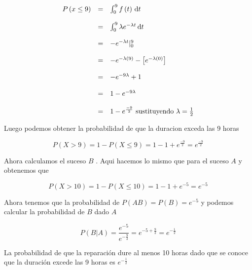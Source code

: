 \documentclass{article}
\begin{document}
\begin{flushleft}
        \begin{equation*}
            \begin{array}{rcl}
                P \left(x \le 9 \right) &  =  & \int_{0}^{9} f\left(t\right) \,\mathrm{d}t 
                \\
                \\
                                        &  =  & \int_{0}^{9} \lambda e^{- \lambda t}  \,\mathrm{d}t 
                \\
                \\
                                        &  =  & - e ^{-\lambda t } |_{0}^{9} 
                \\
                \\
                                        & = & -e^{- \lambda \left(9\right)} - \left[e^{-  \lambda \left(0\right) }\right]
                \\
                \\
                                        & = & -e^{-9 \lambda} + 1   
                \\
                \\
                                        & = & 1 - e^{-9 \lambda}   
                \\
                \\
                                        & = & 1 - e^{\frac{-9}{2}}  \mbox{ sustituyendo  $ \lambda = \frac{1}{2}$}
            \end{array}
        \end{equation*}

        Luego podemos obtener la probabilidad de que la duracion exceda las 9 horas 
        
        \begin{equation*}
            P \left(X > 9 \right) = 1 -  P \left(X \le 9 \right)  = 1 - 1 + e^{\frac{-9}{2}} = e^{\frac{-9}{2}}
        \end{equation*}

        Ahora calculamos el suceso $B$ . Aqui hacemos lo mismo que para el suceso $A$ y obtenemos que 

        \begin{equation*}
            P \left(X > 10 \right) = 1 -  P \left(X \le 10 \right)  = 1 - 1 + e^{-5} = e^{-5}
        \end{equation*}

        Ahora tenemos que la probabilidad de $P \left(AB\right) = P \left(B\right) = e^{-5}$
        y podemos calcular la probabilidad de $B$ dado $A$ 

        \begin{equation*}
            P \left(B|A\right) = \frac{e^{-5}}{e^{-\frac{9}{2}}} = e^{-5 + \frac{9}{2}}  = e^{-\frac{1}{2}}
        \end{equation*}

        La probabilidad de que la reparaci\'on dure al menos 10 horas dado que se conoce
        que la duraci\'on excede las 9 horas es $e^{-\frac{1}{2}}$

    \end{flushleft}
    
\end{document}
